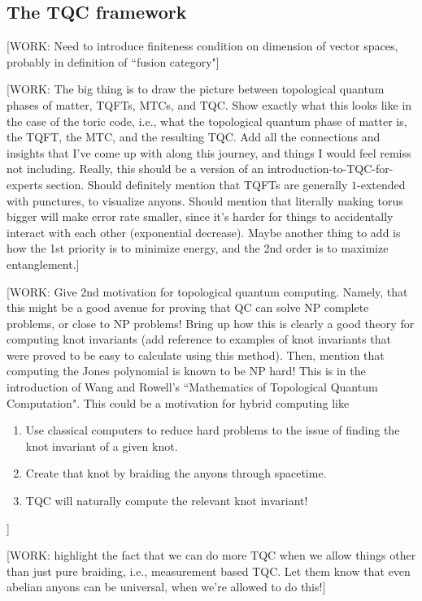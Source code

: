 \documentclass{article}
\theoremstyle{definition}
\numberwithin{figure}{section}
\begin{document}
\subsection{The TQC framework}
\label{The TQC framework}

[WORK: Need to introduce finiteness condition on dimension of vector spaces, probably in definition of ``fusion category"]

[WORK: The big thing is to draw the picture between topological quantum phases of matter, TQFTs, MTCs, and TQC. Show exactly what this looks like in the case of the toric code, i.e., what the topological quantum phase of matter is, the TQFT, the MTC, and the resulting TQC. Add all the connections and insights that I've come up with along this journey, and things I would feel remiss not including. Really, this should be a version of an introduction-to-TQC-for-experts section. Should definitely mention that TQFTs are generally $1$-extended with punctures, to visualize anyons. Should mention that literally making torus bigger will make error rate smaller, since it's harder for things to accidentally interact with each other (exponential decrease). Maybe another thing to add is how the 1st priority is to minimize energy, and the 2nd order is to maximize entanglement.]

[WORK: Give 2nd motivation for topological quantum computing. Namely, that this might be a good avenue for proving that QC can solve NP complete problems, or close to NP problems! Bring up how this is clearly a good theory for computing knot invariants (add reference to examples of knot invariants that were proved to be easy to calculate using this method). Then, mention that computing the Jones polynomial is known to be NP hard! This is in the introduction of Wang and Rowell's ``Mathematics of Topological Quantum Computation". This could be a motivation for hybrid computing like

\begin{enumerate}
\item Use classical computers to reduce hard problems to the issue of finding the knot invariant of a given knot.
\item Create that knot by braiding the anyons through spacetime.
\item TQC will naturally compute the relevant knot invariant!
\end{enumerate}
]

[WORK: highlight the fact that we can do more TQC when we allow things other than just pure braiding, i.e., measurement based TQC. Let them know that even abelian anyons can be universal, when we're allowed to do this!]
\end{document}
